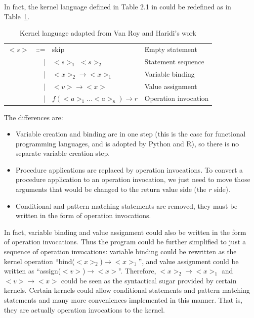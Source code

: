 In fact, the kernel language defined in Table 2.1 in \cite{van2004concepts} could be redefined as in Table~\ref{tab:kernel}. 
\begin{table}
	\centering
	\begin{tabular}{|rrll|}
		\hline $<s>$ & ::= & skip & Empty statement \\ 
		  & | & $<s>_1$ $<s>_2$ & Statement sequence \\ 
		  & | & $<x>_2\rightarrow <x>_1$ & Variable binding \\ 
		  & | & $<v>\rightarrow<x>$ & Value assignment \\ 
		  & | & $f(<a>_1\dots<a>_n)\rightarrow r$ & Operation invocation \\ 
		\hline 
	\end{tabular} 
	\caption{Kernel language adapted from Van Roy and Haridi's work}
	\label{tab:kernel}
\end{table}
The differences are:
\begin{itemize}
	\item Variable creation and binding are in one step (this is the case for functional programming languages, and is adopted by Python and R), so there is no separate variable creation step.
	\item Procedure applications are replaced by operation invocations. To convert a procedure application to an operation invocation, we just need to move those arguments that would be changed to the return value side (the $r$ side).
	\item Conditional and pattern matching statements are removed, they must be written in the form of operation invocations.
\end{itemize}
In fact, variable binding and value assignment could also be written in the form of operation invocations. Thus the program could be further simplified to just a sequence of operation invocations: variable binding could be rewritten as the kernel operation ``bind($<x>_2$)$\rightarrow <x>_1$'', and value assignment could be written as ``assign($<v>$)$\rightarrow <x>$''. Therefore, $<x>_2\rightarrow <x>_1$ and $<v>\rightarrow<x>$ could be seen as the syntactical sugar provided by certain kernels. Certain kernels could allow conditional statements and pattern matching statements and many more conveniences implemented in this manner. That is, they are actually operation invocations to the kernel.

